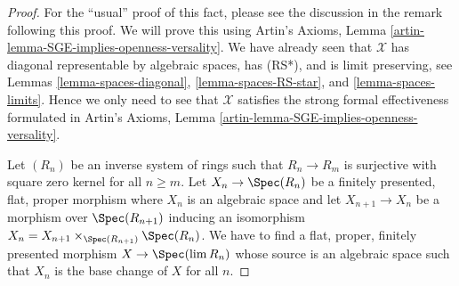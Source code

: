 \begin{proof}
For the ``usual'' proof of this fact, please see the discussion
in the remark following this proof. We will prove this using
Artin's Axioms, Lemma \ref{artin-lemma-SGE-implies-openness-versality}.
We have already seen that $\mathcal{X}$ has diagonal
representable by algebraic spaces, has (RS*), and is limit preserving,
see Lemmas \ref{lemma-spaces-diagonal},
\ref{lemma-spaces-RS-star}, and
\ref{lemma-spaces-limits}.
Hence we only need to see that $\mathcal{X}$ satisfies the strong
formal effectiveness formulated in
Artin's Axioms, Lemma \ref{artin-lemma-SGE-implies-openness-versality}.

\medskip\noindent
Let $(R_n)$ be an inverse system of rings such that
$R_n \to R_m$ is surjective with square zero kernel for
all $n \geq m$. Let $X_n \to \Spec(R_n)$ be a finitely presented,
flat, proper morphism where $X_n$ is an algebraic space and
let $X_{n + 1} \to X_n$ be a morphism over $\Spec(R_{n + 1})$
inducing an isomorphism $X_n = X_{n + 1} \times_{\Spec(R_{n + 1})} \Spec(R_n)$.
We have to find a flat, proper, finitely presented morphism
$X \to \Spec(\lim R_n)$ whose source is an algebraic space
such that $X_n$ is the base change of $X$ for all $n$.


\end{proof}
